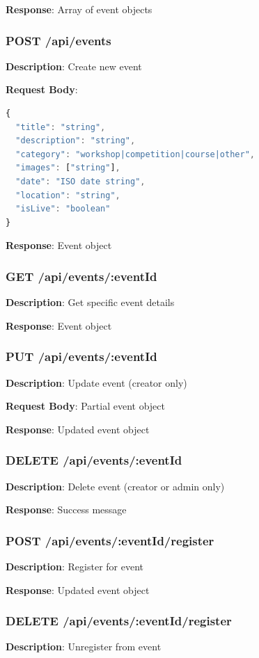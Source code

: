 \documentclass{scrreprt}
\begin{document}
\textbf{Response}: Array of event objects

\subsubsection{POST /api/events}
\textbf{Description}: Create new event

\textbf{Request Body}:
\begin{lstlisting}[language=JavaScript]
{
  "title": "string",
  "description": "string",
  "category": "workshop|competition|course|other",
  "images": ["string"],
  "date": "ISO date string",
  "location": "string",
  "isLive": "boolean"
}
\end{lstlisting}

\textbf{Response}: Event object

\subsubsection{GET /api/events/:eventId}
\textbf{Description}: Get specific event details

\textbf{Response}: Event object

\subsubsection{PUT /api/events/:eventId}
\textbf{Description}: Update event (creator only)

\textbf{Request Body}: Partial event object

\textbf{Response}: Updated event object

\subsubsection{DELETE /api/events/:eventId}
\textbf{Description}: Delete event (creator or admin only)

\textbf{Response}: Success message

\subsubsection{POST /api/events/:eventId/register}
\textbf{Description}: Register for event

\textbf{Response}: Updated event object

\subsubsection{DELETE /api/events/:eventId/register}
\textbf{Description}: Unregister from event
\end{document}
